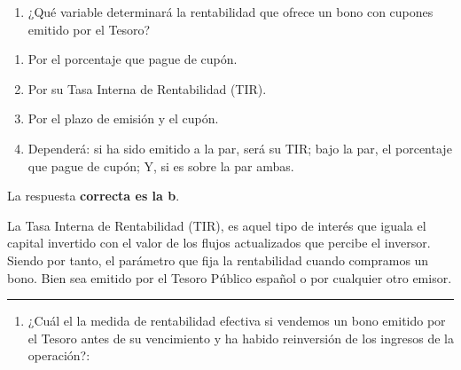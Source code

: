 \documentclass[
  letterpaper,
  DIV=11,
  numbers=noendperiod]{scrreprt}
\providecommand{\tightlist}{%
  \setlength{\itemsep}{0pt}\setlength{\parskip}{0pt}}\usepackage{longtable,booktabs,array}
\begin{document}
\begin{enumerate}
\def\labelenumi{\arabic{enumi}.}
\setcounter{enumi}{12}
\tightlist
\item
  ¿Qué variable determinará la rentabilidad que ofrece un bono con
  cupones emitido por el Tesoro?
\end{enumerate}

\begin{enumerate}
\def\labelenumi{\alph{enumi}.}
\item
  Por el porcentaje que pague de cupón.
\item
  Por su Tasa Interna de Rentabilidad (TIR).
\item
  Por el plazo de emisión y el cupón.
\item
  Dependerá: si ha sido emitido a la par, será su TIR; bajo la par, el
  porcentaje que pague de cupón; Y, si es sobre la par ambas.
\end{enumerate}

\begin{tcolorbox}[enhanced jigsaw, left=2mm, opacityback=0, colback=white, breakable, arc=.35mm, bottomrule=.15mm, rightrule=.15mm, toprule=.15mm, leftrule=.75mm, colframe=quarto-callout-tip-color-frame]
\begin{minipage}[t]{5.5mm}
\textcolor{quarto-callout-tip-color}{\faLightbulb}
\end{minipage}%
\begin{minipage}[t]{\textwidth - 5.5mm}

La respuesta \textbf{correcta es la b}.

La Tasa Interna de Rentabilidad (TIR), es aquel tipo de interés que
iguala el capital invertido con el valor de los flujos actualizados que
percibe el inversor. Siendo por tanto, el parámetro que fija la
rentabilidad cuando compramos un bono. Bien sea emitido por el Tesoro
Público español o por cualquier otro emisor.

\end{minipage}%
\end{tcolorbox}

\begin{center}\rule{0.5\linewidth}{0.5pt}\end{center}

\begin{enumerate}
\def\labelenumi{\arabic{enumi}.}
\setcounter{enumi}{13}
\tightlist
\item
  ¿Cuál el la medida de rentabilidad efectiva si vendemos un bono
  emitido por el Tesoro antes de su vencimiento y ha habido reinversión
  de los ingresos de la operación?:
\end{enumerate}
\end{document}
